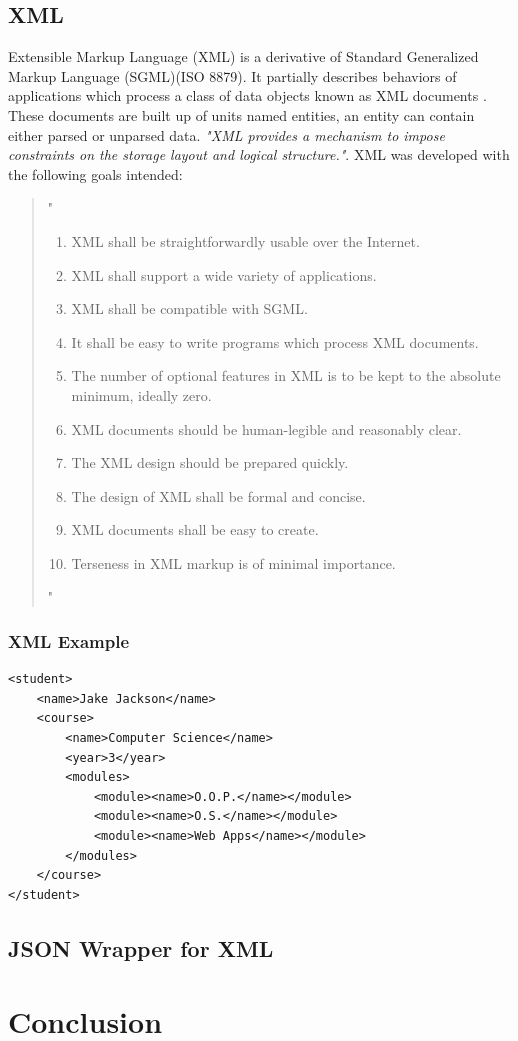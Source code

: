 \subsection{XML}
	Extensible Markup Language (XML) is a derivative of Standard Generalized Markup Language (SGML)(ISO 8879). It partially describes behaviors of applications which process a class of data objects known as XML documents \cite{w3c}. These documents are built up of units named entities, an entity can contain either parsed or unparsed data. \emph{"XML provides a mechanism to impose constraints on the storage layout and logical structure."}\cite{w3c}. XML was developed with the following goals intended:
\begin{quotation}"
\begin{enumerate}
 \item XML shall be straightforwardly usable over the Internet.
	\item XML shall support a wide variety of applications.
	\item XML shall be compatible with SGML.
	\item It shall be easy to write programs which process XML documents.
	\item The number of optional features in XML is to be kept to the absolute minimum, ideally zero.
	\item XML documents should be human-legible and reasonably clear.
	\item The XML design should be prepared quickly.
	\item The design of XML shall be formal and concise.
	\item XML documents shall be easy to create.
	\item Terseness in XML markup is of minimal importance.
    \end{enumerate}"\cite{w3c}
\end{quotation}

\subsubsection{XML Example}
\begin{verbatim}
<student>
	<name>Jake Jackson</name>
	<course>
		<name>Computer Science</name>
		<year>3</year>
		<modules>
			<module><name>O.O.P.</name></module>
			<module><name>O.S.</name></module>
			<module><name>Web Apps</name></module>
		</modules>
	</course>
</student>
\end{verbatim}

\subsection{JSON Wrapper for XML}

    


\section{Conclusion}
